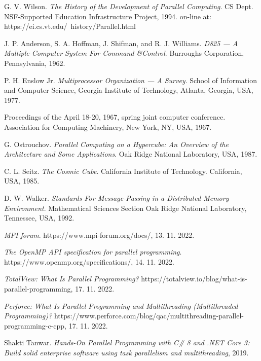 \documentclass[a4paper]{article}
\begin{document}
	\begin{thebibliography}{50}
		
		 G. V. Wilson. \emph{The History of the Development of Parallel Computing}. CS Dept. NSF-Supported Education Infrastructure Project, 1994. on-line at: https://ei.cs.vt.edu/~history/Parallel.html
		
		 J. P. Anderson, S. A. Hoffman, J. Shifman, and R. J. Williams. \emph{D825 — A Multiple-Computer System For Command \&Control}. Burroughs Corporation, Pennsylvania, 1962.
		
		 P. H. Enslow Jr. \emph{Multiprocessor Organization — A Survey}. School of Information and Computer Science, Georgia Institute of Technology, Atlanta, Georgia, USA, 1977.
		
		 Proceedings of the April 18-20, 1967, spring joint computer conference. Association for Computing Machinery, New York, NY, USA, 1967.
		
		 G. Ostrouchov. \emph{Parallel Computing on a Hypercube: An Overview of the Architecture and Some Applications}. Oak Ridge National Laboratory, USA, 1987.
		
		 C. L. Seitz. \emph{The Cosmic Cube}. California Institute of Technology. California, USA, 1985.
		
		 D. W. Walker. \emph{Standards For Message-Passing in a Distributed Memory Environment}. Mathematical Sciences Section Oak Ridge National Laboratory, Tennessee, USA, 1992.
		
		 \emph{MPI forum}. https://www.mpi-forum.org/docs/, 13. 11. 2022.
		
		 \emph{The OpenMP API specification for parallel programming}. https://www.openmp.org/specifications/, 14. 11. 2022.
		
		 \emph{TotalView: What Is Parallel Programming?} https://totalview.io/blog/what-is-parallel-programming, 17. 11. 2022.
		
		 \emph{Perforce: What Is Parallel Programming and Multithreading (Multithreaded Programming)?} https://www.perforce.com/blog/qac/multithreading-parallel-programming-c-cpp, 17. 11. 2022.
		
		 Shakti Tanwar. \emph{Hands-On Parallel Programming with C\# 8 and .NET Core 3: Build solid enterprise software using task parallelism and multithreading}, 2019.
		

\end{thebibliography}
\end{document}
